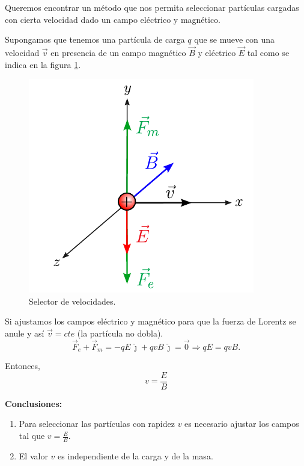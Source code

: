 \begin{ejemplo}
Queremos encontrar un método que nos permita seleccionar partículas cargadas con cierta velocidad dado un campo eléctrico  y magnético.

Supongamos que tenemos una partícula de carga $q$ que se mueve con una velocidad $\vec{v}$ en presencia de un campo magnético $\vec{B}$ y eléctrico $\vec{E}$ tal como se indica en la  figura \ref{fig:Selector-Velocidades}.

\begin{figure}[H]
    \centering
    \includegraphics[scale = 0.9]{Figuras/Selector-Velocidades.pdf}
    \caption{Selector de velocidades.}
    \label{fig:Selector-Velocidades}
\end{figure}

Si ajustamos los campos eléctrico y magnético para que la fuerza de Lorentz se anule y así $\vec{v} = cte$ (la partícula no dobla).
$$\Vec{F}_e + \Vec{F}_m = -qE \,\hat{\jmath} + qvB \,\hat{\jmath} = \vec{0} \Rightarrow qE = qvB.$$

Entonces,
\begin{equation*}
\boxed{v = \frac{E}{B}}
\end{equation*}


\textbf{Conclusiones:}

\begin{enumerate}
\item Para seleccionar las partículas con rapidez $v$ es necesario ajustar los campos tal que $v = \frac{E}{B}$.

\item El valor $v$ es independiente de la carga y de la masa.
\end{enumerate}
\end{ejemplo}

